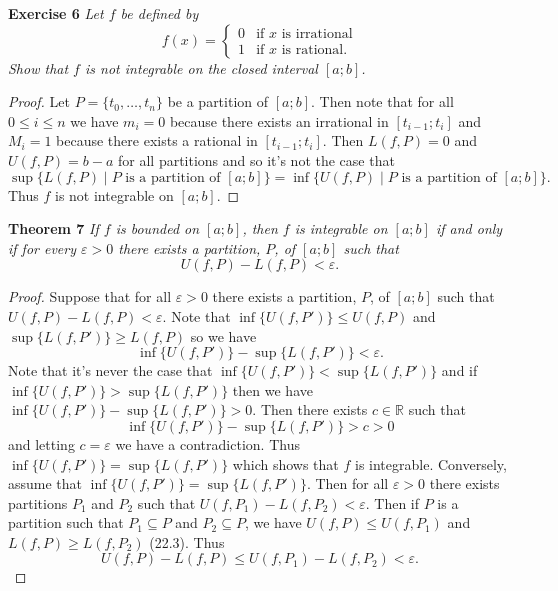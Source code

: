 \documentclass{article}
\begin{document}
\begin{flushleft}
\textbf{Exercise 6}
\textsl{Let $f$ be defined by
\[
f(x) =
\begin{cases}
0 & \text{if $x$ is irrational}\\
1 & \text{if $x$ is rational}.
\end{cases}
\]
Show that $f$ is not integrable on the closed interval $[a;b]$.}
\begin{proof}
Let $P = \{t_0, \dots , t_n\}$ be a partition of $[a;b]$. Then note that for all $0 \leq i \leq n$ we have $m_i = 0$ because there exists an irrational in $[t_{i-1}; t_i]$ and $M_i = 1$ because there exists a rational in $[t_{i-1}; t_i]$. Then $L(f,P) = 0$ and $U(f,P) = b-a$ for all partitions and so it's not the case that
\[
\sup \{L(f,P) \mid \text{$P$ is a partition of $[a;b]$} \} = \inf \{U(f,P) \mid \text{$P$ is a partition of $[a;b]$} \}.
\]
Thus $f$ is not integrable on $[a;b]$.
\end{proof}

\textbf{Theorem 7}
\textsl{If $f$ is bounded on $[a;b]$, then $f$ is integrable on $[a;b]$ if and only if for every $\varepsilon > 0$ there exists a partition, $P$, of $[a;b]$ such that
\[
U(f,P) - L(f,P) < \varepsilon.
\]}
\begin{proof}
Suppose that for all $\varepsilon > 0$ there exists a partition, $P$, of $[a;b]$ such that $U(f,P) - L(f,P) < \varepsilon$. Note that $\inf \{U(f,P')\} \leq U(f,P)$ and $\sup \{L(f,P')\} \geq L(f,P)$ so we have
\[
\inf \{U(f,P')\} - \sup \{L(f,P')\} < \varepsilon.
\]
Note that it's never the case that $\inf \{U(f,P')\} < \sup \{L(f,P')\}$ and if $\inf \{U(f,P')\} > \sup \{L(f,P')\}$ then we have $\inf \{U(f,P')\} - \sup \{L(f,P')\} > 0$. Then there exists $c \in \mathbb{R}$ such that
\[
\inf \{U(f,P')\} - \sup \{L(f,P')\} > c > 0
\]
and letting $c = \varepsilon$ we have a contradiction. Thus $\inf \{U(f,P')\} = \sup \{L(f,P')\}$ which shows that $f$ is integrable. Conversely, assume that $\inf \{U(f,P')\} = \sup \{L(f,P')\}$. Then for all $\varepsilon > 0$ there exists partitions $P_1$ and $P_2$ such that $U(f,P_1) - L(f,P_2) < \varepsilon$. Then if $P$ is a partition such that $P_1 \subseteq P$ and $P_2 \subseteq P$, we have $U(f,P) \leq U(f,P_1)$ and $L(f,P) \geq L(f,P_2)$ (22.3). Thus
\[
U(f,P) - L(f,P) \leq U(f,P_1) - L(f,P_2) < \varepsilon.
\]
\end{proof}


\end{flushleft}
\end{document}
